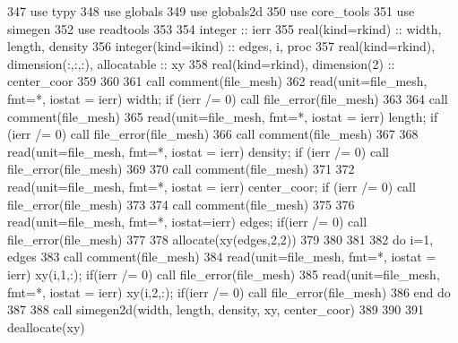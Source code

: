 \begin{DoxyCode}
347       \textcolor{keywordtype}{use }typy
348       \textcolor{keywordtype}{use }globals
349       \textcolor{keywordtype}{use }globals2d
350       \textcolor{keywordtype}{use }core_tools
351       \textcolor{keywordtype}{use }simegen
352       \textcolor{keywordtype}{use }readtools
353 
354       \textcolor{keywordtype}{integer} :: ierr
355       \textcolor{keywordtype}{real(kind=rkind)} :: width, length, density
356       \textcolor{keywordtype}{integer(kind=ikind)} :: edges, i, proc
357       \textcolor{keywordtype}{real(kind=rkind)}, \textcolor{keywordtype}{dimension(:,:,:)}, \textcolor{keywordtype}{allocatable} :: xy
358       \textcolor{keywordtype}{real(kind=rkind)}, \textcolor{keywordtype}{dimension(2)} :: center\_coor
359       
360 
361       \textcolor{keyword}{call }comment(file_mesh)
362       \textcolor{keyword}{read}(unit=file_mesh, fmt=*, iostat = ierr) width; \textcolor{keywordflow}{if} (ierr /= 0) \textcolor{keyword}{call }
      file_error\textcolor{comment}{(file_mesh)}
363 \textcolor{comment}{}
364 \textcolor{comment}{      }\textcolor{keyword}{call }comment(file_mesh)
365       \textcolor{keyword}{read}(unit=file_mesh, fmt=*, iostat = ierr) length; \textcolor{keywordflow}{if} (ierr /= 0) \textcolor{keyword}{call }
      file_error\textcolor{comment}{(file_mesh)}
366 \textcolor{comment}{      }\textcolor{keyword}{call }comment(file_mesh)
367 
368       \textcolor{keyword}{read}(unit=file_mesh, fmt=*, iostat = ierr) density; \textcolor{keywordflow}{if} (ierr /= 0)\textcolor{comment}{ }\textcolor{keyword}{call }
      file_error\textcolor{comment}{(file_mesh)}
369 \textcolor{comment}{}
370 \textcolor{comment}{      }\textcolor{keyword}{call }comment(file_mesh)
371       
372       \textcolor{keyword}{read}(unit=file_mesh, fmt=*, iostat = ierr) center\_coor; \textcolor{keywordflow}{if} (ierr /\textcolor{comment}{= 0) }\textcolor{keyword}{call }
      file_error\textcolor{comment}{(file_mesh)    }
373 \textcolor{comment}{      }
374 \textcolor{comment}{      }\textcolor{keyword}{call }comment(file_mesh)
375             
376       \textcolor{keyword}{read}(unit=file_mesh, fmt=*, iostat=ierr) edges; \textcolor{keywordflow}{if}(ierr /= 0) \textcolor{keyword}{call }
      file_error\textcolor{comment}{(file_mesh)}
377 \textcolor{comment}{}
378 \textcolor{comment}{      }\textcolor{keyword}{allocate}(xy(edges,2,2))
379       
380       
381 
382       \textcolor{keywordflow}{do} i=1, edges
383         \textcolor{keyword}{call }comment(file_mesh)
384         \textcolor{keyword}{read}(unit=file_mesh, fmt=*, iostat = ierr) xy(i,1,:); \textcolor{keywordflow}{if}(ierr /= 0) \textcolor{keyword}{call }
      file_error\textcolor{comment}{(file_mesh)}
385 \textcolor{comment}{        }\textcolor{keyword}{read}(unit=file_mesh, fmt=*, iostat = ierr) xy(i,2,:); \textcolor{keywordflow}{if}(ierr /= 0) \textcolor{keyword}{call }
      file_error\textcolor{comment}{(file_mesh)}
386 \textcolor{comment}{}\textcolor{keywordflow}{      end do}
387         
388       \textcolor{keyword}{call }simegen2d(width, length, density, xy, center\_coor)
389 
390 
391       \textcolor{keyword}{deallocate}(xy)
\end{DoxyCode}


